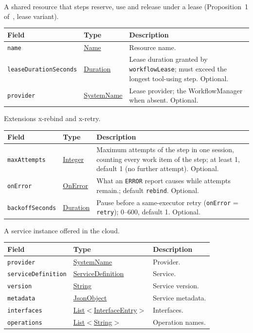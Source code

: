 \documentclass[a4paper]{arrowhead}
\newcommand{\mref}[1]{{\textcolor{ArrowheadPurple}{\hyperref[sec:model:#1]{#1}}}}
\newcommand{\pref}[1]{{\textcolor{ArrowheadGrey}{\hyperref[sec:model:primitives:#1]{#1}}}}
\begin{document}
A shared resource that steps reserve, use and release under a lease (Proposition~1 of~\cite{varga2026}, lease variant).

{\small
\begin{longtable}{|p{3.9cm}|p{4.4cm}|p{7.5cm}|}

\hline
\rowcolor{gray!33} Field & Type & Description \\ \hline
\endhead
\texttt{name} & \pref{Name} & Resource name. \\ \hline
\texttt{lease\allowbreak{}Duration\allowbreak{}Seconds} & \pref{Duration} & Lease duration granted by \texttt{workflowLease}; must exceed the longest tool-using step. Optional. \\ \hline
\texttt{provider} & \pref{SystemName} & Lease provider; the WorkflowManager when absent. Optional. \\ \hline
\end{longtable}
}

Extensions x-rebind and x-retry.

{\small
\begin{longtable}{|p{3.9cm}|p{4.4cm}|p{7.5cm}|}

\hline
\rowcolor{gray!33} Field & Type & Description \\ \hline
\endhead
\texttt{maxAttempts} & \pref{Integer} & Maximum attempts of the step in one session, counting every work item of the step; at least 1, default 1 (no further attempt). Optional. \\ \hline
\texttt{onError} & \mref{OnError} & What an \texttt{ERROR} report causes while attempts remain.; default \texttt{rebind}. Optional. \\ \hline
\texttt{backoff\allowbreak{}Seconds} & \pref{Duration} & Pause before a same-executor retry (\texttt{onError} = \texttt{retry}); 0--600, default 1. Optional. \\ \hline
\end{longtable}
}

A service instance offered in the cloud.

{\small
\begin{longtable}{|p{3.9cm}|p{4.4cm}|p{7.5cm}|}

\hline
\rowcolor{gray!33} Field & Type & Description \\ \hline
\endhead
\texttt{provider} & \pref{SystemName} & Provider. \\ \hline
\texttt{service\allowbreak{}Definition} & \pref{ServiceDefinition} & Service. \\ \hline
\texttt{version} & \pref{String} & Service version. \\ \hline
\texttt{metadata} & \pref{JsonObject} & Service metadata. \\ \hline
\texttt{interfaces} & \pref{List}$<$\mref{InterfaceEntry}$>$ & Interfaces. \\ \hline
\texttt{operations} & \pref{List}$<$\pref{String}$>$ & Operation names. \\ \hline
\end{longtable}
}
\end{document}
